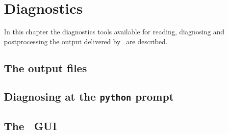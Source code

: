 \chapter{Diagnostics}\label{CHAP_DIAG}

In this chapter the diagnostics tools available for reading, 
diagnosing and postprocessing the output delivered by 
\stella~are described.

\section{The output files}

\section{Diagnosing at the \texttt{python} prompt}

\section{The \stella~GUI}


